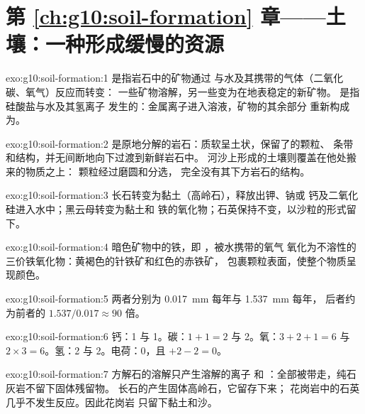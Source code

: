 \section*{第 \ref{ch:g10:soil-formation} 章——土壤：一种形成缓慢的资源}

\begin{solution}{exo:g10:soil-formation:1}
是指岩石中的矿物通过
与水及其携带的气体（二氧化碳、氧气）反应而转变：
一些矿物溶解，另一些变为在地表稳定的新矿物。
是指硅酸盐与水及其氢离子
发生的：金属离子进入溶液，矿物的其余部分
重新构成为。
\end{solution}

\begin{solution}{exo:g10:soil-formation:2}
是原地分解的岩石：质软呈土状，保留了的颗粒、
条带和结构，并无间断地向下过渡到新鲜岩石中。
河沙上形成的土壤则覆盖在他处搬来的物质之上：
颗粒经过磨圆和分选，
完全没有其下方岩石的结构。
\end{solution}

\begin{solution}{exo:g10:soil-formation:3}
长石转变为黏土（高岭石），释放出钾、钠或
钙及二氧化硅进入水中；黑云母转变为黏土和
铁的氧化物；石英保持不变，以沙粒的形式留下。
\end{solution}

\begin{solution}{exo:g10:soil-formation:4}
暗色矿物中的铁，即 ，被水携带的氧气
氧化为不溶性的三价铁氧化物：黄褐色的针铁矿和红色的赤铁矿，
包裹颗粒表面，使整个物质呈现颜色。
\end{solution}

\begin{solution}{exo:g10:soil-formation:5}
两者分别为 \qty{0.017}{mm} 每年与 \qty{1.537}{mm} 每年，
后者约为前者的 $1.537/0.017 \approx 90$ 倍。
\end{solution}

\begin{solution}{exo:g10:soil-formation:6}
钙：1 与 1。碳：$1 + 1 = 2$ 与 2。氧：$3 + 2 + 1 = 6$ 与
$2 \times 3 = 6$。氢：2 与 2。电荷：0，且 $+2 - 2 = 0$。
\end{solution}

\begin{solution}{exo:g10:soil-formation:7}
方解石的溶解只产生溶解的离子  和
：全部被带走，纯石灰岩不留下固体残留物。
长石的产生固体高岭石，它留存下来；
花岗岩中的石英几乎不发生反应。因此花岗岩
只留下黏土和沙。
\end{solution}


